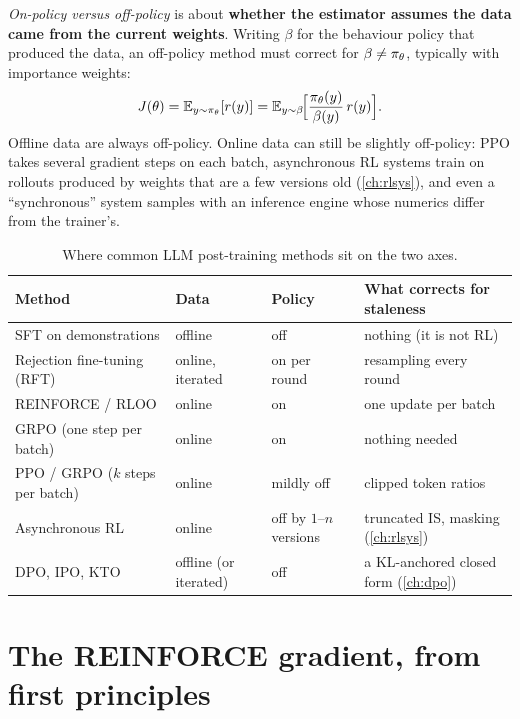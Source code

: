 \emph{On-policy versus off-policy} is about \textbf{whether the estimator assumes the data
came from the current weights}. Writing $\beta$ for the behaviour policy that produced the
data, an off-policy method must correct for $\beta\ne\pi_\theta$, typically with importance
weights:
\begin{equation}
J(\theta)=\mathbb{E}_{y\sim\pi_\theta}[r(y)]=\mathbb{E}_{y\sim\beta}\!\Big[\frac{\pi_\theta(y)}{\beta(y)}\,r(y)\Big].
\label{eq:pg:is}
\end{equation}
Offline data are always off-policy. Online data can still be slightly off-policy: PPO takes
several gradient steps on each batch, asynchronous RL systems train on rollouts produced by
weights that are a few versions old (\cref{ch:rlsys}), and even a ``synchronous'' system
samples with an inference engine whose numerics differ from the trainer's.

\begin{table}[ht]
\centering\small
\begin{tabularx}{\linewidth}{@{}lllX@{}}
\toprule
Method & Data & Policy & What corrects for staleness\\
\midrule
SFT on demonstrations & offline & off & nothing (it is not RL)\\
Rejection fine-tuning (RFT) & online, iterated & on per round & resampling every round\\
REINFORCE / RLOO & online & on & one update per batch\\
GRPO (one step per batch) & online & on & nothing needed\\
PPO / GRPO ($k$ steps per batch) & online & mildly off & clipped token ratios\\
Asynchronous RL & online & off by $1$--$n$ versions & truncated IS, masking (\cref{ch:rlsys})\\
DPO, IPO, KTO & offline (or iterated) & off & a KL-anchored closed form (\cref{ch:dpo})\\
\bottomrule
\end{tabularx}
\caption{Where common LLM post-training methods sit on the two axes.}
\label{tab:pg:onoff}
\end{table}

\section{The REINFORCE gradient, from first principles}\label{sec:pg:reinforce}

